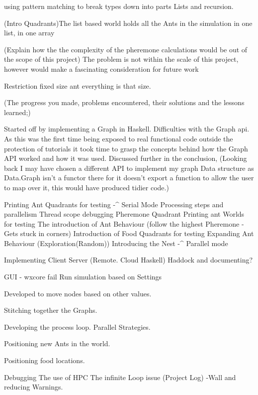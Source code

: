 \documentclass[main.tex]{subfiles}
\begin{document}
using pattern matching to break types down into parts Lists and recursion.

(Intro Quadrants)The list based world holds all the Ants in the simulation in one list, 
in one array

(Explain how the the complexity of the pheremone calculations would be out of the scope of this project)
The problem is not within the scale of this project, however would make a fascinating consideration for future work

Restriction fixed size ant everything is that size.


(The progress you made, problems encountered,
their solutions and the lessons learned;)

Started off by implementing a Graph in Haskell. Difficulties with the Graph api. As this was the first time being exposed to real functional code outside the protection of tutorials it took time to grasp the concepts behind how the Graph API worked and how it was used. Discussed further in the conclusion, (Looking back I may have chosen a different API to implement my graph Data structure as Data.Graph isn't a functor there for it doesn't export a function to allow the user to map over it, this would have produced tidier code.)



Printing Ant Quadrants for testing -^ Serial Mode
Processing steps and parallelism
Thread scope debugging
Pheremone Quadrant
Printing ant Worlds for testing
The introduction of Ant Behaviour (follow the highest Pheremone - Gets stuck in corners)
Introduction of Food Quadrants for testing
Expanding Ant Behaviour (Exploration(Random))
Introducing the Nest -^ Parallel mode

Implementing Client Server (Remote. Cloud Haskell) 
Haddock and documenting?

GUI - wxcore fail
Run simulation based on Settings

Developed to move nodes based on other values.

Stitching together the Graphs.

Developing the process loop. Parallel Strategies.

Positioning new Ants in the world.

Positioning food locations.

Debugging
The use of HPC
The infinite Loop issue (Project Log)
-Wall and reducing Warnings.
\end{document}
